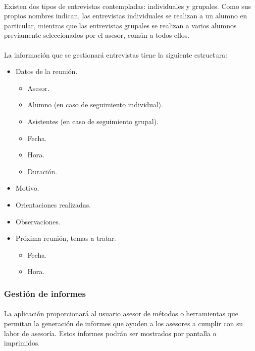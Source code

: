      \paragraph{}Existen dos tipos de entrevistas contempladas: individuales y
      grupales. Como sus propios nombres indican, las entrevistas individuales
      se realizan a un alumno en particular, mientras que las entrevistas
      grupales se realizan a varios alumnos previamente seleccionados por el
      asesor, común a todos ellos.

      \paragraph{}La información que se gestionará entrevistas tiene la
      siguiente estructura:

      \begin{itemize}
         \item Datos de la reunión.
         \begin{itemize}
            \item Asesor.
            \item Alumno (en caso de seguimiento individual).
            \item Asistentes (en caso de seguimiento grupal).
            \item Fecha.
            \item Hora.
            \item Duración.
         \end{itemize}
         \item Motivo.
         \item Orientaciones realizadas.
         \item Observaciones.
         \item Próxima reunión, temas a tratar.
         \begin{itemize}
            \item Fecha.
            \item Hora.
         \end{itemize}
      \end{itemize}

      \subsubsection{Gestión de informes}

      \paragraph{}La aplicación proporcionará al usuario asesor de métodos o
      herramientas que permitan la generación de informes que ayuden a los
      asesores a cumplir con su labor de asesoría. Estos informes podrán ser
      mostrados por pantalla o imprimidos.

